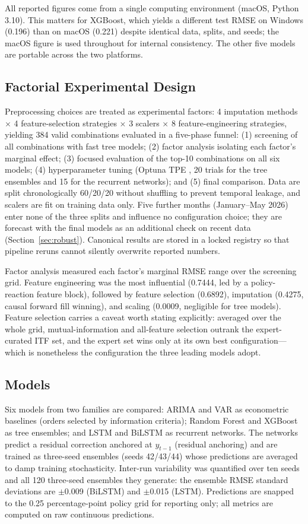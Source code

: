 \documentclass[conference]{IEEEtran}
\begin{document}
All reported figures come from a single computing environment (macOS, Python 3.10). This matters for XGBoost, which yields a different test RMSE on Windows (0.196) than on macOS (0.221) despite identical data, splits, and seeds; the macOS figure is used throughout for internal consistency. The other five models are portable across the two platforms.

\subsection{Factorial Experimental Design}
Preprocessing choices are treated as experimental factors: 4 imputation methods $\times$ 4 feature-selection strategies $\times$ 3 scalers $\times$ 8 feature-engineering strategies, yielding 384 valid combinations evaluated in a five-phase funnel: (1) screening of all combinations with fast tree models; (2) factor analysis isolating each factor's marginal effect; (3) focused evaluation of the top-10 combinations on all six models; (4) hyperparameter tuning (Optuna TPE \cite{akiba2019}, 20 trials for the tree ensembles and 15 for the recurrent networks); and (5) final comparison. Data are split chronologically 60/20/20 without shuffling to prevent temporal leakage, and scalers are fit on training data only. Five further months (January--May 2026) enter none of the three splits and influence no configuration choice; they are forecast with the final models as an additional check on recent data (Section~\ref{sec:robust}). Canonical results are stored in a locked registry so that pipeline reruns cannot silently overwrite reported numbers.

Factor analysis measured each factor's marginal RMSE range over the screening grid. Feature engineering was the most influential (0.7444, led by a policy-reaction feature block), followed by feature selection (0.6892), imputation (0.4275, causal forward fill winning), and scaling (0.0009, negligible for tree models). Feature selection carries a caveat worth stating explicitly: averaged over the whole grid, mutual-information and all-feature selection outrank the expert-curated ITF set, and the expert set wins only at its own best configuration---which is nonetheless the configuration the three leading models adopt.

\subsection{Models}
Six models from two families are compared: ARIMA and VAR as econometric baselines (orders selected by information criteria); Random Forest \cite{breiman2001} and XGBoost \cite{chen2016} as tree ensembles; and LSTM \cite{hochreiter1997} and BiLSTM \cite{schuster1997} as recurrent networks. The networks predict a residual correction anchored at $y_{t-1}$ (residual anchoring) and are trained as three-seed ensembles (seeds 42/43/44) whose predictions are averaged to damp training stochasticity. Inter-run variability was quantified over ten seeds and all 120 three-seed ensembles they generate: the ensemble RMSE standard deviations are $\pm$0.009 (BiLSTM) and $\pm$0.015 (LSTM). Predictions are snapped to the 0.25 percentage-point policy grid for reporting only; all metrics are computed on raw continuous predictions.
\end{document}
